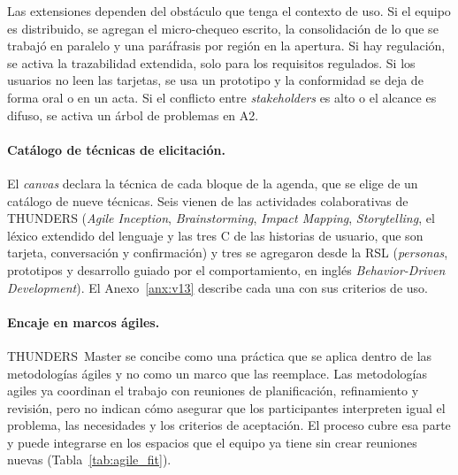 \documentclass[12pt,letterpaper,oneside]{report}
\begin{document}
Las extensiones dependen del obstáculo que tenga el contexto de uso. Si el equipo es
distribuido, se agregan el micro-chequeo escrito, la consolidación de lo que se
trabajó en paralelo y una paráfrasis por región en la apertura. Si hay
regulación, se activa la trazabilidad extendida, solo para los requisitos
regulados. Si los usuarios no leen las tarjetas, se usa un prototipo y
la conformidad se deja de forma oral o en un acta. Si el conflicto entre \textit{stakeholders} es alto o el
alcance es difuso, se activa un árbol de problemas en A2.

\paragraph{Catálogo de técnicas de elicitación.}
\label{sec:catalogo}
El \textit{canvas} declara la técnica de cada bloque de la agenda, que se elige
de un catálogo de nueve técnicas. Seis vienen de las actividades colaborativas de
THUNDERS (\textit{Agile Inception}, \textit{Brainstorming}, \textit{Impact
Mapping}, \textit{Storytelling}, el léxico extendido del lenguaje y las tres C de las historias de usuario, que
son tarjeta, conversación y confirmación) y tres se agregaron desde la RSL (\textit{personas},
prototipos y desarrollo guiado por el comportamiento, en inglés
\textit{Behavior-Driven Development}). El Anexo~\ref{anx:v13} describe cada una con sus criterios de
uso.

\paragraph{Encaje en marcos ágiles.}
\label{sec:encaje_agil}
THUNDERS~Master se concibe como una práctica que se aplica dentro de las
metodologías ágiles y no como un marco que las reemplace. Las metodologías agiles ya
coordinan el trabajo con reuniones de planificación, refinamiento y revisión,
pero no indican cómo asegurar que los participantes interpreten igual el
problema, las necesidades y los criterios de aceptación. El proceso cubre esa
parte y puede integrarse en los espacios que el equipo ya tiene sin crear
reuniones nuevas (Tabla~\ref{tab:agile_fit}).
\end{document}
